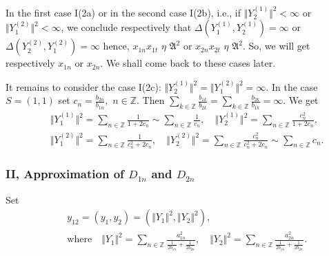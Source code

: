\documentclass[preprint,12pt]{elsarticle}
\numberwithin{equation}{section}
\begin{document}
In the first case I(2a) or in the second case I(2b), i.e., if $\Vert Y_2^{(1)}\Vert^2\!<\!\infty$  or $\Vert Y_1^{(2)}\Vert^2\!<\!\infty$, we conclude  
respectively that
$\Delta(Y_1^{(1)},Y_2^{(1)})\!=\!\infty$ or $\Delta(Y_2^{(2)},Y_1^{(2)})=\infty$ hence, $x_{1n}x_{1t}\,\,\eta\,\, {\mathfrak A} ^2$ or 
$x_{2n}x_{2t}\,\,\eta\,\, {\mathfrak A} ^2$. So, we will get respectively  $x_{1n}$ or $x_{2n}$.
%
We shall come back to these cases later.

%
It remains to consider the case I(2c): $\Vert Y_2^{(1)}\Vert^2=\Vert Y_1^{(2)}\Vert^2=\infty$.
%
In the case $S=(1,1)$ set $c_n=\frac{b_{2n}}{b_{1n}},\,\,n\in{\mathbb Z}$. 
Then  $\sum_{k\in{\mathbb Z}}\frac{b_{1k}}{b_{2k}}\!=\!\sum_{k\in{\mathbb Z}}\frac{b_{2k}}{b_{1k}}\!=\!\infty.$
We get
%
\begin{eqnarray}
\label{Y11,Y12}
&&\Vert Y_1^{(1)}\Vert^2=\sum_{n\in \mathbb Z}\frac{1}{1+2c_n}\sim\sum_{n\in \mathbb Z}\frac{1}{c_n},\quad
\Vert Y_2^{(1)}\Vert^2=\sum_{n\in \mathbb Z}\frac{c_n^2}{1+2c_n},\\
\label{Y21,Y22}
&&\Vert Y_1^{(2)}\Vert^2=\sum_{n\in \mathbb Z}\frac{1}{c_n^2+2c_n},\quad
\Vert Y_2^{(2)}\Vert^2=\sum_{n\in \mathbb Z}\frac{c_n^2}{c_n^2+2c_n}\sim\sum_{n\in \mathbb Z}c_n.
\end{eqnarray}

%
\subsubsection{II, Approximation of $D_{1n}$ and $D_{2n}$}
%
Set
%
\begin{eqnarray}
\label{y=.m=2}
&&y_{12}=(y_1,y_2)=(\Vert Y_1\Vert^2,\Vert Y_2\Vert^2),\\
\label{Y1,Y2.m=2}
&&\text{where}\quad\Vert Y_1\Vert^2=\sum_{n\in {\mathbb Z}}\frac{a_{1n}^2}{\frac{1}{2b_{1n}}+\frac{1}{2b_{2n}}},\quad
\Vert Y_2\Vert^2=\sum_{n\in {\mathbb Z}}\frac{a_{2n}^2}{\frac{1}{2b_{1n}}+\frac{1}{2b_{2n}}}.
\end{eqnarray}
\end{document}
